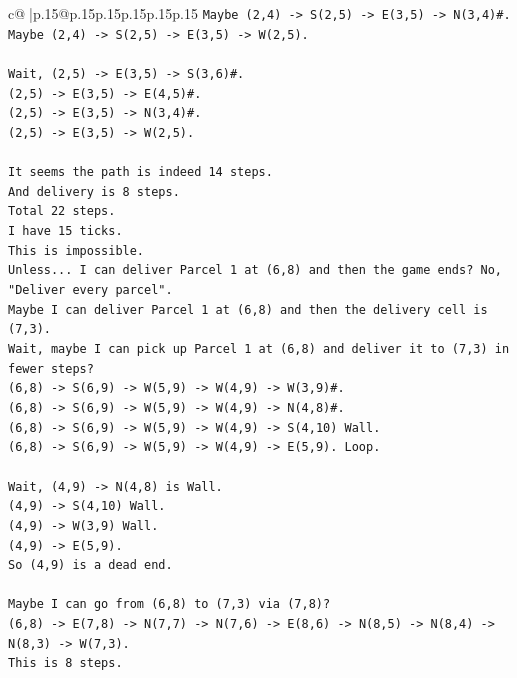 \documentclass{article}
\begin{document}
{\begin{supertabular}{c@{$\;$}|p{.15\linewidth}@{}p{.15\linewidth}p{.15\linewidth}p{.15\linewidth}p{.15\linewidth}p{.15\linewidth}}
{{{\texttt{Maybe (2,4) {-}> S(2,5) {-}> E(3,5) {-}> N(3,4)\#.} \\
\texttt{Maybe (2,4) {-}> S(2,5) {-}> E(3,5) {-}> W(2,5).} \\
\\ 
\texttt{Wait, (2,5) {-}> E(3,5) {-}> S(3,6)\#.} \\
\texttt{(2,5) {-}> E(3,5) {-}> E(4,5)\#.} \\
\texttt{(2,5) {-}> E(3,5) {-}> N(3,4)\#.} \\
\texttt{(2,5) {-}> E(3,5) {-}> W(2,5).} \\
\\ 
\texttt{It seems the path is indeed 14 steps.} \\
\texttt{And delivery is 8 steps.} \\
\texttt{Total 22 steps.} \\
\texttt{I have 15 ticks.} \\
\texttt{This is impossible.} \\
\texttt{Unless... I can deliver Parcel 1 at (6,8) and then the game ends? No, "Deliver every parcel".} \\
\texttt{Maybe I can deliver Parcel 1 at (6,8) and then the delivery cell is (7,3).} \\
\texttt{Wait, maybe I can pick up Parcel 1 at (6,8) and deliver it to (7,3) in fewer steps?} \\
\texttt{(6,8) {-}> S(6,9) {-}> W(5,9) {-}> W(4,9) {-}> W(3,9)\#.} \\
\texttt{(6,8) {-}> S(6,9) {-}> W(5,9) {-}> W(4,9) {-}> N(4,8)\#.} \\
\texttt{(6,8) {-}> S(6,9) {-}> W(5,9) {-}> W(4,9) {-}> S(4,10) Wall.} \\
\texttt{(6,8) {-}> S(6,9) {-}> W(5,9) {-}> W(4,9) {-}> E(5,9). Loop.} \\
\\ 
\texttt{Wait, (4,9) {-}> N(4,8) is Wall.} \\
\texttt{(4,9) {-}> S(4,10) Wall.} \\
\texttt{(4,9) {-}> W(3,9) Wall.} \\
\texttt{(4,9) {-}> E(5,9).} \\
\texttt{So (4,9) is a dead end.} \\
\\ 
\texttt{Maybe I can go from (6,8) to (7,3) via (7,8)?} \\
\texttt{(6,8) {-}> E(7,8) {-}> N(7,7) {-}> N(7,6) {-}> E(8,6) {-}> N(8,5) {-}> N(8,4) {-}> N(8,3) {-}> W(7,3).} \\
\texttt{This is 8 steps.} \\
}}}
\end{supertabular}}
\end{document}
